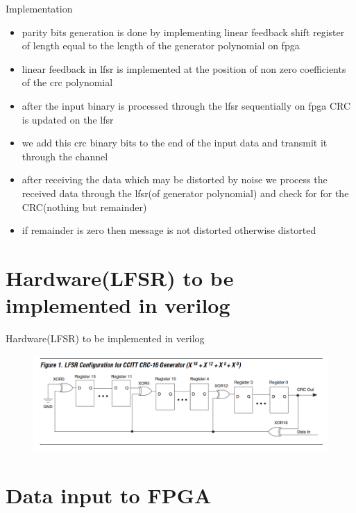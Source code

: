 \documentclass{beamer}
\begin{document}
\begin{frame}{Implementation}

\begin{itemize}
    \item parity bits generation is done by implementing linear feedback shift register of length equal to the length of the generator polynomial on fpga
    \item linear feedback in lfsr is implemented at the position of non zero coefficients of the crc polynomial
    \item after the input binary is processed through the lfsr sequentially on fpga CRC is updated on the lfsr
    \item we add this crc binary bits to the end of the input data and transmit it through the channel
    \item after receiving the data which may be distorted by noise we process the received data through the lfsr(of generator polynomial) and check for for the CRC(nothing but remainder)
    \item if remainder is zero then message is not distorted otherwise distorted
\end{itemize}
\end{frame}
\section{Hardware(LFSR) to be implemented in verilog}
\begin{frame}{Hardware(LFSR) to be implemented in verilog}
    \begin{figure}
    \includegraphics[width=\textwidth]{lfsr.png}
    \end{figure}

\end{frame}

\section{Data input to FPGA}
\end{document}
